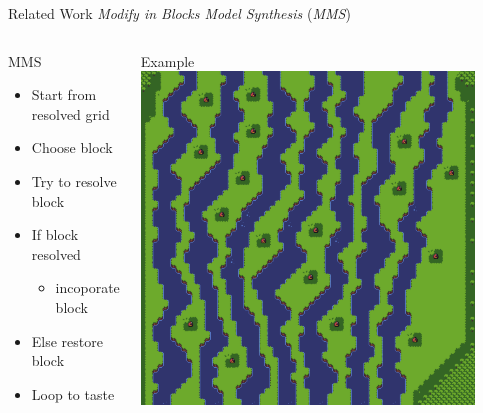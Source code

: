 \documentclass{beamer}
\begin{document}
  \begin{frame}[fragile]{Related Work}
    \textit{Modify in Blocks Model Synthesis} (\textit{MMS})
    \begin{columns}[T,onlytextwidth]
        \begin{block}{MMS}
          \hfill \\
          \begin{itemize}
            \item Start from resolved grid
            \item Choose block
            \item Try to resolve block
            \item If block resolved
              \begin{itemize}
                \item incoporate block
              \end{itemize}
            \item Else restore block
            \item Loop to taste
          \end{itemize}
        \end{block}
        \begin{block}{Example}
          \includegraphics[width=0.9\textwidth]{img/forestmicro_64x64.pdf}
        \end{block}
    \end{columns}
  \end{frame}
\end{document}
